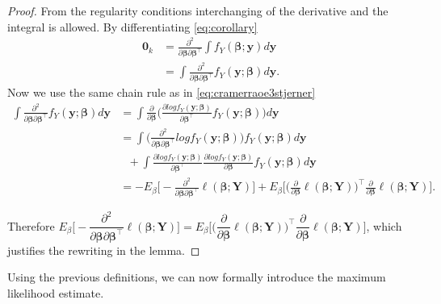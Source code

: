 \begin{proof}
From the regularity conditions interchanging of the derivative and the integral is allowed. By differentiating \eqref{eq:corollary}
\begin{align*}
\textbf{0}_{k} &= \frac{\partial^2}{\partial \boldsymbol{\beta} \partial \boldsymbol{\beta}^\top} \int f_Y(\boldsymbol{\beta};\textbf{y})d\textbf{y} \\
&=\int \frac{\partial^2}{\partial \boldsymbol{\beta} \partial \boldsymbol{\beta}^\top}f_Y(\textbf{y};\boldsymbol{\beta}) d\textbf{y}.
\end{align*}
Now we use the same chain rule as in \eqref{eq:cramerraoe3stjerner}
\begin{align*}
\int \frac{\partial^2}{\partial \boldsymbol{\beta} \partial \boldsymbol{\beta}^\top}f_Y(\textbf{y};\boldsymbol{\beta}) d\textbf{y} &= \int \frac{\partial}{\partial \boldsymbol{\beta}} \bigg( \frac{\partial log f_Y(\textbf{y};\boldsymbol{\beta})}{\partial \boldsymbol{\beta}^\top} f_Y(\textbf{y};\boldsymbol{\beta}) \bigg)d\textbf{y} \\
&= \int \bigg( \frac{\partial^2}{\partial \boldsymbol{\beta} \partial \boldsymbol{\beta}^\top } log f_Y(\textbf{y};\boldsymbol{\beta})  \bigg) f_Y(\textbf{y};\boldsymbol{\beta}) d\textbf{y} \\
& \ \ \ + \int \frac{\partial log f_Y(\textbf{y};\boldsymbol{\beta})}{\partial \boldsymbol{\beta}^\top} \frac{\partial log f_Y(\textbf{y};\boldsymbol{\beta})}{\partial \boldsymbol{\beta}} f_Y(\textbf{y};\boldsymbol{\beta}) d\textbf{y} \\
& =  -E_{\beta}\bigg[-\frac{\partial^2}{\partial \boldsymbol{\beta} \partial \boldsymbol{\beta}^\top} \ell(\boldsymbol{\beta};\textbf{Y}) \bigg]+  E_{\beta}\bigg[\bigg( \frac{\partial}{\partial \boldsymbol{\beta}}\ell(\boldsymbol{\beta};\textbf{Y}) \bigg)^\top \frac{\partial}{\partial \boldsymbol{\beta}}\ell(\boldsymbol{\beta};\textbf{Y})  \bigg].
\end{align*}

Therefore $E_{\beta}\bigg[-\dfrac{\partial^2}{\partial \boldsymbol{\beta} \partial \boldsymbol{\beta}^\top} \ell(\boldsymbol{\beta};\textbf{Y}) \bigg] = E_{\beta}\bigg[\bigg( \dfrac{\partial}{\partial \boldsymbol{\beta}}\ell(\boldsymbol{\beta};\textbf{Y}) \bigg)^\top \dfrac{\partial}{\partial \boldsymbol{\beta}}\ell(\boldsymbol{\beta};\textbf{Y})  \bigg]$, which justifies the rewriting in the lemma. 
\end{proof}

Using the previous definitions, we can now formally introduce the maximum likelihood estimate. 

